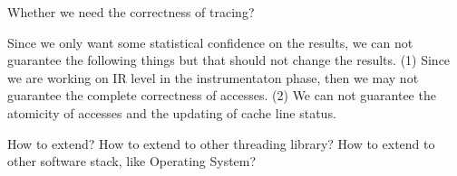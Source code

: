Whether we need the correctness of tracing?

Since we only want some statistical confidence on the results, we can not guarantee the following things but that
should not change the results.
(1) Since we are working on IR level in the instrumentaton phase, then we may not guarantee the complete correctness of 
accesses. 
(2) We can not guarantee the atomicity of accesses and the updating of cache line status.

How to extend?
How to extend to other threading library?
How to extend to other software stack, like Operating System? 
